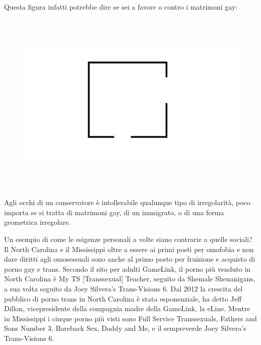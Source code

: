 \documentclass[12pt]{book} %
\begin{document}
Questa figura infatti potrebbe dire se sei a favore o contro i matrimoni gay:


\bigskip



\begin{figure}[H]
\includegraphics[width=15.875cm,height=8.864cm]{images/Libro-img031.png}\end{figure}

\bigskip

Agli occhi di un conservatore è intollerabile qualunque tipo di irregolarità, poco importa se si tratta di matrimoni
gay, di un immigrato, o di una forma geometrica irregolare.


\bigskip

Un esempio di come le esigenze personali a volte siano contrarie a quelle sociali? Il North Carolina e il Mississippi
oltre a essere ai primi posti per omofobia e non dare diritti agli omosessuali sono anche al primo posto per fruizione
e acquisto di porno gay e trans. Secondo il sito per adulti GameLink, il porno più venduto in North Carolina è My TS
[Transsexual] Teacher, seguito da Shemale Shenanigans, a sua volta seguito da Joey Silvera's Trans-Visions 6.
{\textquotedbl}Dal 2012 la crescita del pubblico di porno trans in North Carolina è stata esponenziale,{\textquotedbl}
ha detto Jeff Dillon, vicepresidente della compagnia madre della GameLink, la eLine. Mentre in Mississippi i cinque
porno più visti sono Full Service Transsexuals, Fathers and Sons Number 3, Bareback Sex, Daddy and Me, e il sempreverde
Joey Silvera's Trans-Visions
6.
\end{document}
